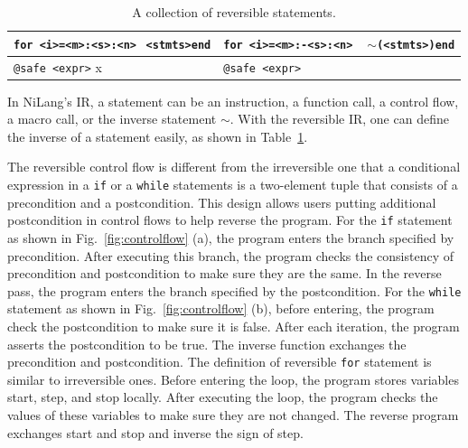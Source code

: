 \documentclass[aps,twocolumn,longbibliography,english,superscriptaddress]{revtex4-1}
\newcommand{\<}{\langle}
\renewcommand{\>}{\rangle}
\newcommand{\cquad}{{{ }_{\quad}}}
\newcommand{\Fig}[1]{Fig.~\ref{#1}}
\newcommand{\Tbl}[1]{Table~\ref{#1}}
\newcommand{\App}[1]{Appendix \ref{#1}}
\theoremstyle{definition}\newtheorem{definition}{\textit{Definition}}
\begin{document}
\begin{table}[h!]
\begin{minipage}{\columnwidth}
{\begin{tabularx}{\textwidth}{X X}
            \hline
            \texttt{for <i>=<m>:<s>:<n>}\newline $\cquad$\texttt{<stmts>}\newline \texttt{end} & \texttt{for <i>=<m>:-<s>:<n>}\newline $\cquad$ \texttt{$\sim$(<stmts>)}\newline \texttt{end}\\
            \hline
            \texttt{@safe <expr>} x & \texttt{@safe <expr>}\\
            \bottomrule
        \end{tabularx}
    }
    \caption{A collection of reversible statements.}\label{tbl:revstatements}
\end{minipage}
\end{table}

In NiLang's IR, a statement can be an instruction, a function call, a control flow, a macro call, or the inverse statement $\sim$.
With the reversible IR, one can define the inverse of a statement easily, as shown in \Tbl{tbl:revstatements}.

The reversible control flow is different from the irreversible one that a conditional expression in a \texttt{if} or a \texttt{while} statements is a two-element tuple that consists of a precondition and a postcondition. This design allows users putting additional postcondition in control flows to help reverse the program.
For the \texttt{if} statement as shown in \Fig{fig:controlflow} (a), the program enters the branch specified by precondition. After executing this branch, the program checks the consistency of precondition and postcondition to make sure they are the same. In the reverse pass, the program enters the branch specified by the postcondition.
For the \texttt{while} statement as shown in \Fig{fig:controlflow} (b), before entering, the program check the postcondition to make sure it is false.
After each iteration, the program asserts the postcondition to be true. The inverse function exchanges the precondition and postcondition.
The definition of reversible \texttt{for} statement is similar to irreversible ones.
Before entering the loop, the program stores variables start, step, and stop locally. After executing the loop, the program checks the values of these variables to make sure they are not changed. The reverse program exchanges start and stop and inverse the sign of step.
\end{document}
